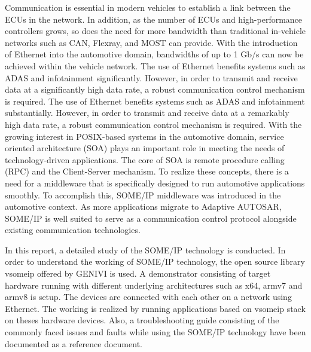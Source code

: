 
Communication is essential in modern vehicles to establish a link between the ECUs in the network. In addition, as the number of ECUs and high-performance controllers grows, so does the need for more bandwidth than traditional in-vehicle networks such as CAN, Flexray, and MOST can provide. With the introduction of Ethernet into the automotive domain, bandwidths of up to 1 Gb/s can now be achieved within the vehicle network. The use of Ethernet benefits systems such as ADAS and infotainment significantly. However, in order to transmit and receive data at a significantly high data rate, a robust communication control mechanism is required. The use of Ethernet benefits systems such as ADAS and infotainment substantially. However, in order to transmit and receive data at a remarkably high data rate, a robust communication control mechanism is required. With the growing interest in POSIX-based systems in the automotive domain, service oriented architecture (SOA) plays an important role in meeting the needs of technology-driven applications. The core of SOA is remote procedure calling (RPC) and the Client-Server mechanism. To realize these concepts, there is a need for a middleware that is specifically designed to run automotive applications smoothly. To accomplish this, SOME/IP middleware was introduced in the automotive context. As more applications migrate to Adaptive AUTOSAR, SOME/IP is well suited to serve as a communication control protocol alongside existing communication technologies.

In this report, a detailed study of the SOME/IP technology is conducted. In order to understand the working of SOME/IP technology, the open source library vsomeip offered by GENIVI is used. A demonstrator consisting of target hardware running with different underlying architectures such as x64, armv7 and armv8 is setup. The devices are connected with each other on a network using Ethernet. The working is realized by running applications based on vsomeip stack on theses hardware devices. Also, a troubleshooting guide consisting of the commonly faced issues and faults while using the SOME/IP technology have been documented as a reference document.
